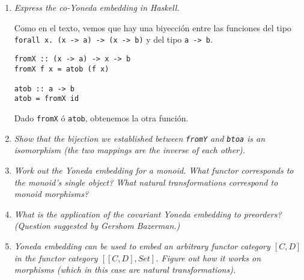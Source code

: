 \documentclass[11pt]{article}
\begin{document}
\begin{enumerate}
\item \textit{Express the co-Yoneda embedding in Haskell.}

Como en el texto, vemos que hay una biyección entre las funciones del tipo \texttt{forall x. (x -> a) -> (x -> b)} y del tipo \texttt{a -> b}.
\begin{verbatim}
fromX :: (x -> a) -> x -> b
fromX f x = atob (f x)

atob :: a -> b
atob = fromX id
\end{verbatim}
Dado \texttt{fromX} ó \texttt{atob}, obtenemos la otra función.

\item \textit{Show that the bijection we established between \texttt{fromY} and \texttt{btoa} is an isomorphism (the two mappings are the inverse of each other).}

\item \textit{Work out the Yoneda embedding for a monoid. What functor corresponds to the monoid's single object? What natural transformations correspond to monoid morphisms?}

\item \textit{What is the application of the covariant Yoneda embedding to preorders? (Question suggested by Gershom Bazerman.)}

\item \textit{Yoneda embedding can be used to embed an arbitrary functor category $[C,D]$ in the functor category $[[C,D],Set]$. Figure out how it works on morphisms (which in this case are natural transformations).}
\end{enumerate}
\end{document}
